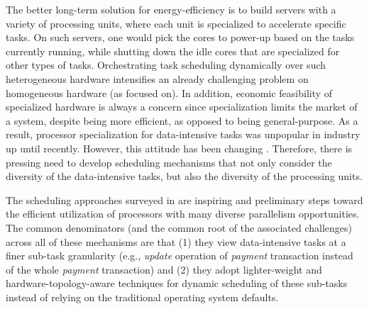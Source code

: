 \documentclass[11pt]{article}
\begin{document}
The better long-term solution for energy-efficiency is to build servers with a variety of processing units,
where each unit is specialized to accelerate specific tasks.
On such servers, one would pick the cores to power-up based on the tasks currently running,
while shutting down the idle cores that are specialized for other types of tasks.
Orchestrating task scheduling dynamically over such heterogeneous hardware intensifies
an already challenging problem on homogeneous hardware (as  focused on).
In addition, economic feasibility of specialized hardware is always a concern
since specialization limits the market of a system, despite being more efficient,
as opposed to being general-purpose.
%
As a result, processor specialization for data-intensive tasks was unpopular in industry up until recently.
However, this attitude has been changing \cite{AlonsoB18, HennessyP19}. %
Therefore, there is pressing need to develop scheduling mechanisms that not only consider
the diversity of the data-intensive tasks, but also the diversity of the processing units.

The scheduling approaches surveyed in  are inspiring and preliminary steps
toward the efficient utilization of processors with many diverse parallelism opportunities.
The common denominators (and the common root of the associated challenges)
across all of these mechanisms are that
(1) they view data-intensive tasks at a finer sub-task granularity
(e.g., \textit{update} operation of \textit{payment} transaction instead of the whole \textit{payment} transaction)
and (2) they adopt lighter-weight and hardware-topology-aware techniques for dynamic scheduling of these sub-tasks
instead of relying on the traditional operating system defaults.
\end{document}
